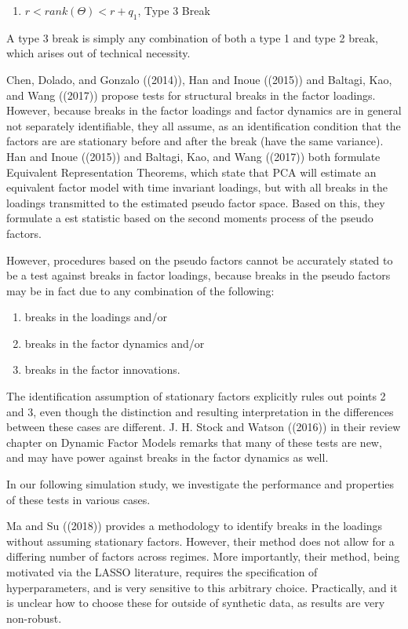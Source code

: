\documentclass[
]{article}
\providecommand{\tightlist}{%
  \setlength{\itemsep}{0pt}\setlength{\parskip}{0pt}}
\begin{document}
\begin{enumerate}
\def\labelenumi{\arabic{enumi}.}
\setcounter{enumi}{2}
\tightlist
\item
  \(r < rank(\Theta) < r + q_1\), Type 3 Break
\end{enumerate}

A type 3 break is simply any combination of both a type 1 and type 2
break, which arises out of technical necessity.

Chen, Dolado, and Gonzalo ((2014)), Han and Inoue ((2015)) and Baltagi,
Kao, and Wang ((2017)) propose tests for structural breaks in the factor
loadings. However, because breaks in the factor loadings and factor
dynamics are in general not separately identifiable, they all assume, as
an identification condition that the factors are are stationary before
and after the break (have the same variance). Han and Inoue ((2015)) and
Baltagi, Kao, and Wang ((2017)) both formulate Equivalent Representation
Theorems, which state that PCA will estimate an equivalent factor model
with time invariant loadings, but with all breaks in the loadings
transmitted to the estimated pseudo factor space. Based on this, they
formulate a est statistic based on the second moments process of the
pseudo factors.

However, procedures based on the pseudo factors cannot be accurately
stated to be a test against breaks in factor loadings, because breaks in
the pseudo factors may be in fact due to any combination of the
following:

\begin{enumerate}
\def\labelenumi{\arabic{enumi}.}
\tightlist
\item
  breaks in the loadings and/or
\item
  breaks in the factor dynamics and/or
\item
  breaks in the factor innovations.
\end{enumerate}

The identification assumption of stationary factors explicitly rules out
points 2 and 3, even though the distinction and resulting interpretation
in the differences between these cases are different. J. H. Stock and
Watson ((2016)) in their review chapter on Dynamic Factor Models remarks
that many of these tests are new, and may have power against breaks in
the factor dynamics as well.

In our following simulation study, we investigate the performance and
properties of these tests in various cases.

Ma and Su ((2018)) provides a methodology to identify breaks in the
loadings without assuming stationary factors. However, their method does
not allow for a differing number of factors across regimes. More
importantly, their method, being motivated via the LASSO literature,
requires the specification of hyperparameters, and is very sensitive to
this arbitrary choice. Practically, and it is unclear how to choose
these for outside of synthetic data, as results are very non-robust.
\end{document}
